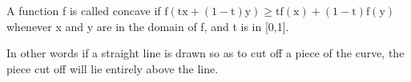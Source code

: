  A function f is called concave if $ \mathrm{f(tx+(1-t)y)}
\geq \mathrm{tf(x)+(1-t)f(y)} $ whenever x and y are in the domain
of f, and t is in [0,1].
\par
In other words if a straight line is drawn so as to cut off a piece of the
curve, the piece cut off will lie entirely above the line.